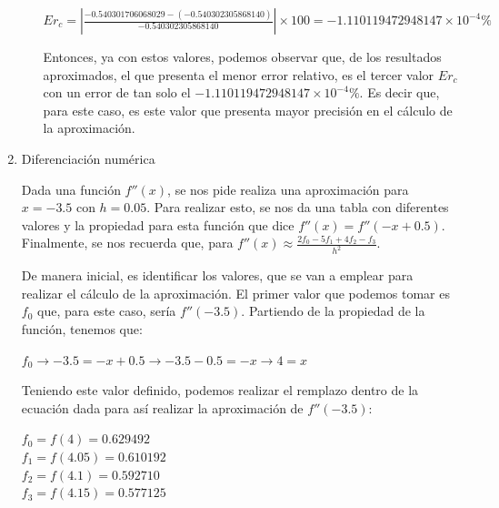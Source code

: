 \documentclass[english,notitlepage,letterpaper, 10pt]{article} %
\begin{document}
\begin{enumerate}
\begin{enumerate}[a)]
\begin{center}
      \begin{math}  
        Er_c = \displaystyle \left| \frac{-0.540301706068029-(-0.540302305868140)}{-0.540302305868140} \right| \times 100 = -1.110119472948147 \times 10^{-4} \%  
      \end{math}  
    \end{center}  
    
    Entonces, ya con estos valores, podemos observar que, de los resultados aproximados, el que presenta el menor error relativo, es el tercer valor $Er_c$ con un error de tan solo el $-1.110119472948147 \times 10^{-4} \%$. Es decir que, para este caso, es este valor que presenta mayor precisión en el cálculo de la aproximación.  
    
    \end{enumerate}

  \item Diferenciación numérica
  
    Dada una función $f''(x)$, se nos pide realiza una aproximación para $x = -3.5$ con $h = 0.05$. Para realizar esto, se nos da una tabla con diferentes valores y la propiedad para esta función que dice $f''(x) = f''(-x+0.5)$. Finalmente, se nos recuerda que, para $f''(x) \approx \frac{2f_0-5f_1+4f_2-f_3}{h^2}$.

    De manera inicial, es identificar los valores, que se van a emplear para realizar el cálculo de la aproximación. El primer valor que podemos tomar es $f_0$ que, para este caso, sería $f''(-3.5)$. Partiendo de la propiedad de la función, tenemos que:

    \begin{center}
      \begin{math}
        f_0 \rightarrow -3.5 = -x + 0.5 \rightarrow -3.5 - 0.5 = -x \rightarrow 4 = x
      \end{math}
    \end{center}


    Teniendo este valor definido, podemos realizar el remplazo dentro de la ecuación dada para así realizar la aproximación de $f''(-3.5)$:

    \begin{center}
      $f_0 = f(4) = 0.629492 $ \\
      $f_1 = f(4.05) = 0.610192 $ \\
      $f_2 = f(4.1) = 0.592710 $ \\
      $f_3 = f(4.15) = 0.577125 $ \\
    \end{center}


\end{enumerate}
\end{document}
